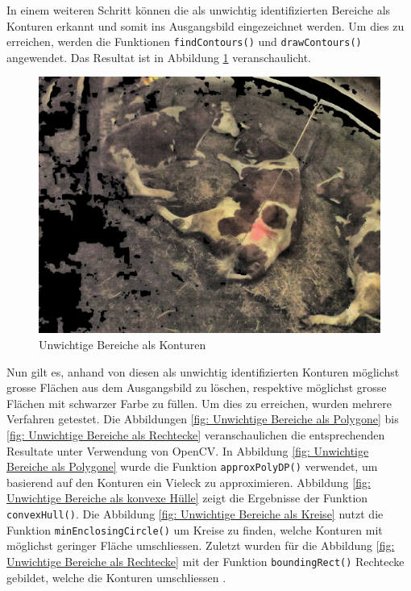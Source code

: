 In einem weiteren Schritt können die als unwichtig identifizierten Bereiche als Konturen erkannt und somit ins Ausgangsbild eingezeichnet werden. Um dies zu erreichen, werden die Funktionen \texttt{findContours()} und \texttt{drawContours()} angewendet. Das Resultat ist in Abbildung \ref{fig: Unwichtige Bereiche als Konturen} veranschaulicht.
\begin{figure}[H]
	\center
	\includegraphics[scale=0.43]{Grafiken/entwicklung/6unwichtigeBereicheEingezeichnet.jpg}
	\caption{Unwichtige Bereiche  als Konturen} 
	\label{fig: Unwichtige Bereiche als Konturen}
\end{figure}

Nun gilt es, anhand von diesen als unwichtig identifizierten Konturen möglichst grosse Flächen aus dem Ausgangsbild zu löschen, respektive möglichst grosse Flächen mit schwarzer Farbe zu füllen. Um dies zu erreichen, wurden mehrere Verfahren getestet. Die Abbildungen  \ref{fig: Unwichtige Bereiche als Polygone} bis \ref{fig: Unwichtige Bereiche als Rechtecke} veranschaulichen die entsprechenden Resultate unter Verwendung von OpenCV. In Abbildung \ref{fig: Unwichtige Bereiche als Polygone} wurde die Funktion \texttt{approxPolyDP()} verwendet, um basierend auf den Konturen ein Vieleck zu approximieren. Abbildung \ref{fig: Unwichtige Bereiche als konvexe Hülle} zeigt die Ergebnisse der Funktion \texttt{convexHull()}. Die Abbildung \ref{fig: Unwichtige Bereiche als Kreise} nutzt die Funktion \texttt{minEnclosingCircle()} um Kreise zu finden, welche Konturen mit möglichst geringer Fläche umschliessen. Zuletzt wurden für die Abbildung \ref{fig: Unwichtige Bereiche als Rechtecke} mit der Funktion \texttt{boundingRect()} Rechtecke gebildet, welche die Konturen umschliessen .

